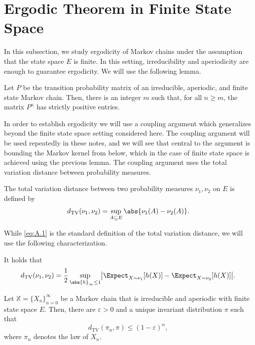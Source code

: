 \section{Ergodic Theorem in Finite State Space}
\label{sec:A.4}

In this subsection, we study ergodicity of Markov chains under the assumption that the state space
$E$ is finite.  In this setting, irreducibility and aperiodicity are enough to guarantee ergodicity.
We will use the following lemma.

\begin{lemma}
\label{lem:A.22}
Let $P$ be the transition probability matrix of an irreducible, aperiodic, and finite state Markov
chain.  Then, there is an integer $m$ such that, for all $n \geq m$, the matrix $P^n$ has strictly
positive entries.
\end{lemma}

In order to establish ergodicity we will use a coupling argument which generalizes beyond the
finite state space setting considered here.  The coupling argument will be used repeatedly in these
notes, and we will see that central to the argument is bounding the Markov kernel from below,
which in the case of finite state space is achieved using the previous lemma.  The coupling
argument uses the total variation distance between probability measures.

\begin{definition}
\label{def:A.23}
The total variation distance between two probability measures $\nu_1, \nu_2$ on $E$ is defined by
\begin{equation}
  d_{\mathrm{TV}}(\nu_1, \nu_2) = \sup_{A \subseteq E} \abs{\nu_1(A) - \nu_2(A)}.
  \label{eq:A.1}
\end{equation}
\end{definition}

While \eqref{eq:A.1} is the standard definition of the total variation distance, we will use the
following characterization.

\begin{lemma}
\label{lem:A.24}
It holds that
\[
  d_{\mathrm{TV}}(\nu_1, \nu_2)
  = \frac{1}{2} \sup_{\abs{h}_\infty \leq 1}
    \bigl|\Expect_{X \sim \nu_1}[h(X)] - \Expect_{X \sim \nu_2}[h(X)]\bigr|.
\]
\end{lemma}

\begin{theorem}
\label{thm:A.25}
Let $\mathbb{X} = \{X_n\}_{n=0}^\infty$ be a Markov chain that is irreducible and aperiodic with
finite state space $E$.  Then, there are $\varepsilon > 0$ and a unique invariant distribution $\pi$
such that
\begin{equation}
  d_{\mathrm{TV}}(\pi_n, \pi) \leq (1 - \varepsilon)^n,
  \label{eq:A.2}
\end{equation}
where $\pi_n$ denotes the law of $X_n$.
\end{theorem}

